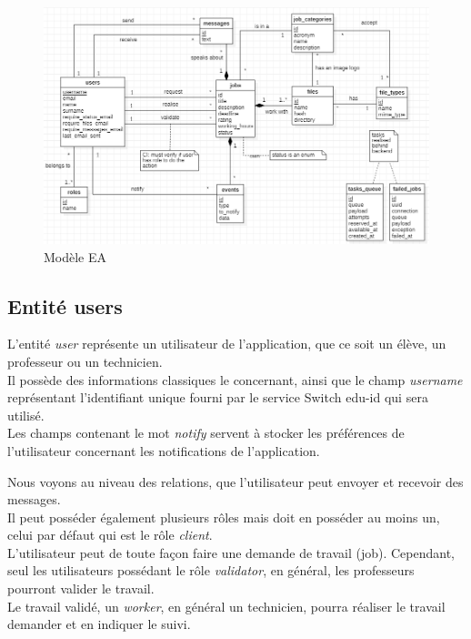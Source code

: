 \documentclass[
    iai, %
    il, %
]{heig-tb}
\begin{document}
\begin{center}
    \begin{figure}
        \includegraphics[width=\textwidth]{./assets/figures/ea.png}
        \caption{Modèle EA \label{ea}}
    \end{figure}
\end{center}

\subsection{Entité users}
L'entité \emph{user} représente un utilisateur de l'application, que ce soit un élève, un professeur ou un technicien.\\
Il possède des informations classiques le concernant, ainsi que le champ \emph{username} représentant l'identifiant unique fourni par le service Switch edu-id qui sera utilisé.\\
Les champs contenant le mot \emph{notify} servent à stocker les préférences de l'utilisateur concernant les notifications de l'application.

Nous voyons au niveau des relations, que l'utilisateur peut envoyer et recevoir des messages.\\
Il peut posséder également plusieurs rôles mais doit en posséder au moins un, celui par défaut qui est le rôle \emph{client}.\\
L'utilisateur peut de toute façon faire une demande de travail (job). Cependant, seul les utilisateurs possédant le rôle \emph{validator}, en général, les professeurs pourront valider le travail.\\
Le travail validé, un \emph{worker}, en général un technicien, pourra réaliser le travail demander et en indiquer le suivi.
\end{document}
